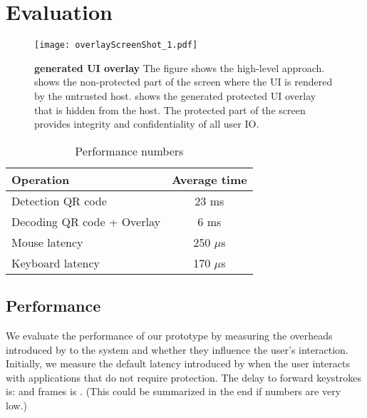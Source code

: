 \section{Evaluation}
\label{sec:eval}

\iffalse
\begin{figure}[t]
\centering
\texttt{[image: overlayScreenShot.pdf]}
\caption{\textbf{\name overlay}. }
\label{fig:screenshot_1}
\centering
\end{figure}
\fi


\begin{figure}[t]
\centering
\texttt{[image: overlayScreenShot\_1.pdf]}
\caption{\textbf{\device generated UI overlay} The figure shows the \name high-level approach. \one shows the non-protected part of the screen where the UI is rendered by the untrusted host. \two shows the \device generated protected UI overlay that is hidden from the host. The protected part of the screen provides integrity and confidentiality of all user IO.}
\spacesave
\label{fig:screenshot_1}
\end{figure}


\begin{table}[t]
\centering
\begin{tabular}{l | c}
\textbf{Operation} & \textbf{Average time} \\\hline
Detection QR code & 23 ms\\
Decoding QR code + Overlay & 6 ms\\
Mouse latency & 250 $\mu$s\\
Keyboard latency & 170 $\mu$s\\\hline
\end{tabular} 
\caption{Performance numbers}\spacesave
\end{table}

\subsection{Performance}

We evaluate the performance of our prototype by measuring the overheads introduced by \name to the system and whether they influence the user's interaction. Initially, we measure the default latency introduced by \device when the user interacts with applications that do not require protection. The delay to forward keystrokes is:  and frames is . (This could be summarized in the end if numbers are very low.)

